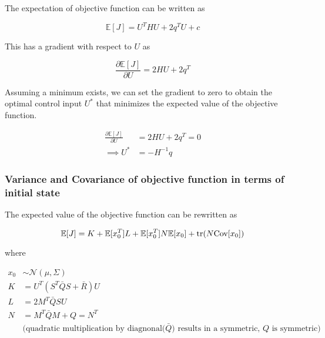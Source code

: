 \documentclass{article}
\begin{document}
The expectation of objective function can be written as

$$
\mathbb{E}[J] = U^T H U + 2 q^T U + c
$$

This has a gradient with respect to $U$ as

$$
\frac{\partial \mathbb{E}[J]}{\partial U} = 2 H U + 2 q^T
$$

Assuming a minimum exists, we can set the gradient to zero to obtain the optimal control input $U^*$ that minimizes the expected value of the objective function.

\begin{equation}
  \begin{aligned}
    \frac{\partial \mathbb{E}[J]}{\partial U} &= 2 H U + 2 q^T = 0 \\
    \implies U^* &= -H^{-1} q
  \end{aligned}
\end{equation}

\subsubsection{Variance and Covariance of objective function in terms of initial state}


The expected value of the objective function can be rewritten as

$$
\mathbb{E}[J] = K + \mathbb{E}[x_0^T] L + \mathbb{E}[x_0^T] N \mathbb{E}[x_0] + \text{tr}(N \text{Cov}[x_0]) \\
$$

where

$$
\begin{aligned}
  x_0 &\sim \mathcal{N}(\mu, \Sigma) \\
  K &= U^T(S^T \bar{Q} S + \bar{R}) U \\
  L &= 2 M^T \bar{Q} S U \\
  N &= M^T \bar{Q} M + Q = N^T \\
  &\text{(quadratic multiplication by diagnonal($\bar{Q}$) results in a symmetric, $Q$ is symmetric)} \\
\end{aligned}
$$
\end{document}
